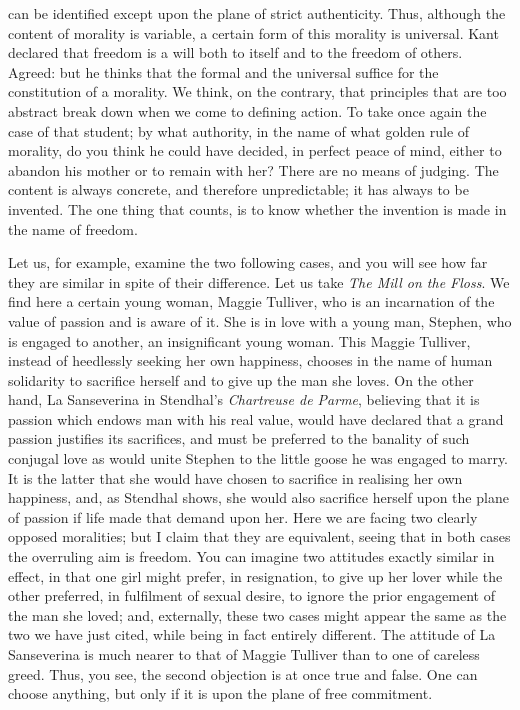 \documentclass[12pt]{article}
\begin{document}
can be identified except upon the plane of strict authenticity. Thus, although the content of morality is variable, a certain form of this morality is universal. Kant declared that freedom is a will both to itself and to the freedom of others. Agreed: but he thinks that the formal and the universal suffice for the constitution of a morality. We think, on the contrary, that principles that are too abstract break down when we come to defining action. To take once again the case of that student; by what authority, in the name of what golden rule of morality, do you think he could have decided, in perfect peace of mind, either to abandon his mother or to remain with her? There are no means of judging. The content is always concrete, and therefore unpredictable; it has always to be invented. The one thing that counts, is to know whether the invention is made in the name of freedom.

Let us, for example, examine the two following cases, and you will see how far they are similar in spite of their difference. Let us take \textit{The Mill on the Floss}. We find here a certain young woman, Maggie Tulliver, who is an incarnation of the value of passion and is aware of it. She is in love with a young man, Stephen, who is engaged to another, an insignificant young woman. This Maggie Tulliver, instead of heedlessly seeking her own happiness, chooses in the name of human solidarity to sacrifice herself and to give up the man she loves. On the other hand, La Sanseverina in Stendhal’s \textit{Chartreuse de Parme}, believing that it is passion which endows man with his real value, would have declared that a grand passion justifies its sacrifices, and must be preferred to the banality of such conjugal love as would unite Stephen to the little goose he was engaged to marry. It is the latter that she would have chosen to sacrifice in realising her own happiness, and, as Stendhal shows, she would also sacrifice herself upon the plane of passion if life made that demand upon her. Here we are facing two clearly opposed moralities; but I claim that they are equivalent, seeing that in both cases the overruling aim is freedom. You can imagine two attitudes exactly similar in effect, in that one girl might prefer, in resignation, to give up her lover while the other preferred, in fulfilment of sexual desire, to ignore the prior engagement of the man she loved; and, externally, these two cases might appear the same as the two we have just cited, while being in fact entirely different. The attitude of La Sanseverina is much nearer to that of Maggie Tulliver than to one of careless greed. Thus, you see, the second objection is at once true and false. One can choose anything, but only if it is upon the plane of free commitment.
\end{document}
